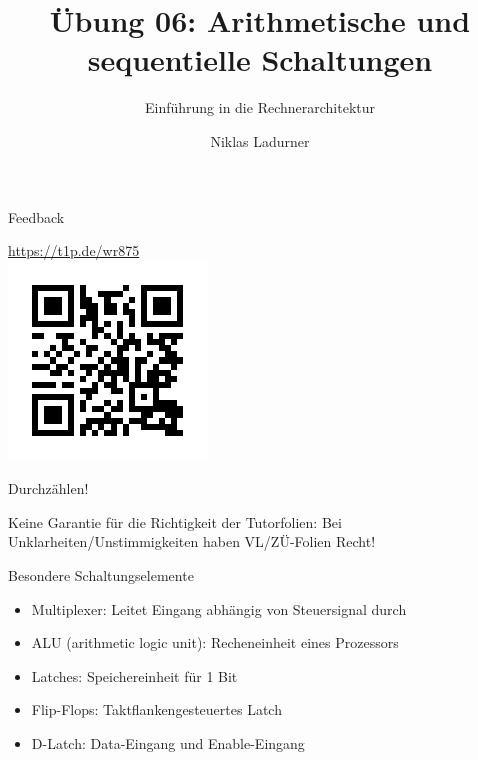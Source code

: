 \documentclass[
  german,            %
  aspectratio=169,    %
]{tumbeamer}
\title{Übung 06: Arithmetische und \\sequentielle Schaltungen}
\subtitle{Einführung in die Rechnerarchitektur}
\author{Niklas Ladurner}
\institute{\theChairName\\\theDepartmentName\\\theUniversityName}
\date{\DTMdisplaydate{2023}{11}{24}{-1}}
\begin{document}
\maketitle

\begin{frame}[c]{Feedback}{}
  \begin{center}
    \LARGE  \href{https://t1p.de/wr875}{https://t1p.de/wr875}\\
    \includegraphics[height=0.5\textheight]{feedback_qr.png}
  \end{center}
\end{frame}

\begin{frame}[c]{}{}
  \begin{center}
    \LARGE  Durchzählen!
  \end{center}
\end{frame}

\begin{frame}[c]{}{}
  \begin{center}
    \LARGE  Keine Garantie für die Richtigkeit der Tutorfolien: Bei Unklarheiten/Unstimmigkeiten
    haben VL/ZÜ-Folien Recht!
  \end{center}
\end{frame}

\begin{frame}[fragile, c]{Besondere Schaltungselemente}{}
  \begin{itemize}
    \item Multiplexer: Leitet Eingang abhängig von Steuersignal durch
    \item ALU (arithmetic logic unit): Recheneinheit eines Prozessors
    \item Latches: Speichereinheit für 1 Bit
    \item Flip-Flops: Taktflankengesteuertes Latch
    \item D-Latch: Data-Eingang und Enable-Eingang
  \end{itemize}
\end{frame}
\end{document}
